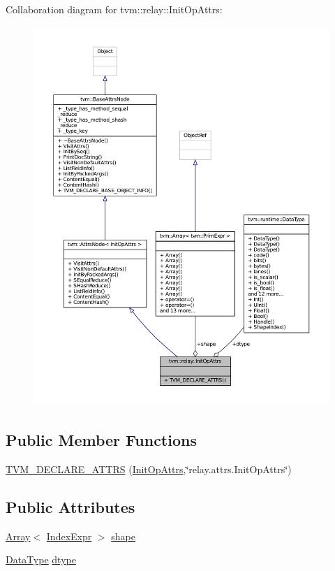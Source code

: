 Collaboration diagram for tvm\+:\+:relay\+:\+:Init\+Op\+Attrs\+:
\nopagebreak
\begin{figure}[H]
\begin{center}
\leavevmode
\includegraphics[width=350pt]{structtvm_1_1relay_1_1InitOpAttrs__coll__graph}
\end{center}
\end{figure}
\subsection*{Public Member Functions}
\begin{DoxyCompactItemize}
\item 
\hyperlink{structtvm_1_1relay_1_1InitOpAttrs_a42b2fdeafe5dd5da210743121c7d376b}{T\+V\+M\+\_\+\+D\+E\+C\+L\+A\+R\+E\+\_\+\+A\+T\+T\+RS} (\hyperlink{structtvm_1_1relay_1_1InitOpAttrs}{Init\+Op\+Attrs},\char`\"{}relay.\+attrs.\+Init\+Op\+Attrs\char`\"{})
\end{DoxyCompactItemize}
\subsection*{Public Attributes}
\begin{DoxyCompactItemize}
\item 
\hyperlink{classtvm_1_1Array}{Array}$<$ \hyperlink{namespacetvm_1_1relay_ae153a27d81399fd266b8d598227764c4}{Index\+Expr} $>$ \hyperlink{structtvm_1_1relay_1_1InitOpAttrs_aa7c73925a6df0388b1221c90fb3d7ba7}{shape}
\item 
\hyperlink{namespacetvm_a41918af1a1dc386388639a9d3ad06c5d}{Data\+Type} \hyperlink{structtvm_1_1relay_1_1InitOpAttrs_a5617315012fde5c880abeccf4693cbdf}{dtype}
\end{DoxyCompactItemize}
